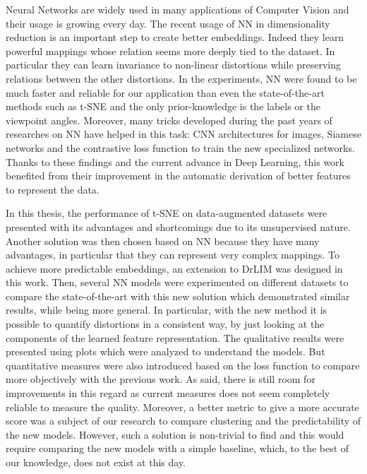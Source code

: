 \documentclass[a4paper,12pt]{report}
\begin{document}
Neural Networks are widely used in many applications of Computer Vision and their usage is growing every day.
The recent usage of NN in dimensionality reduction is an important step to create better embeddings.
Indeed they learn powerful mappings whose relation seems more deeply tied to the dataset.
In particular they can learn invariance to non-linear distortions while preserving relations between the other distortions.
In the experiments, NN were found to be much faster and reliable for our application than even the state-of-the-art methods such as t-SNE and the only prior-knowledge is the labels or the viewpoint angles.
Moreover, many tricks developed during the past years of researches on NN have helped in this task: CNN architectures for images, Siamese networks and the contrastive loss function to train the new specialized networks.
Thanks to these findings and the current advance in Deep Learning, this work benefited from their improvement in the automatic derivation of better features to represent the data.

In this thesis, the performance of t-SNE on data-augmented datasets were presented with its advantages and shortcomings due to its unsupervised nature.
Another solution was then chosen based on NN because they have many advantages, in particular that they can represent very complex mappings.
To achieve more predictable embeddings, an extension to DrLIM was designed in this work.
Then, several NN models were experimented on different datasets to compare the state-of-the-art with this new solution which demonstrated similar results, while being more general.
In particular, with the new method it is possible to quantify distortions in a consistent way, by just looking at the components of the learned feature representation.
The qualitative results were presented using plots which were analyzed to understand the models.
But quantitative measures were also introduced based on the loss function to compare more objectively with the previous work.
As said, there is still room for improvements in this regard as current measures does not seem completely reliable to measure the quality.
Moreover, a better metric to give a more accurate score was a subject of our research to compare clustering and the predictability of the new models.
However, such a solution is non-trivial to find and this would require comparing the new models with a simple baseline, which, to the best of our knowledge, does not exist at this day.
\end{document}

